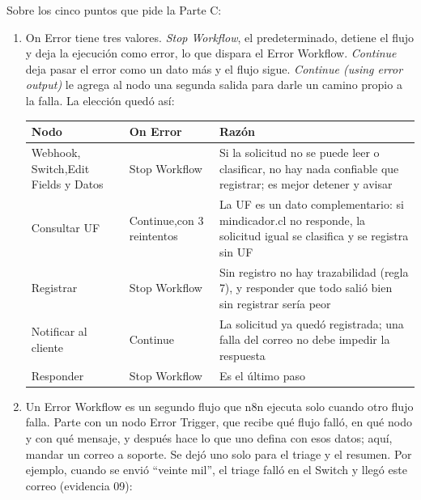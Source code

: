\documentclass{article}
\begin{document}
Sobre los cinco puntos que pide la Parte C:
\begin{enumerate}
\item On Error tiene tres valores. \emph{Stop Workflow}, el predeterminado, detiene el flujo y
deja la ejecución como error, lo que dispara el Error Workflow. \emph{Continue} deja pasar el
error como un dato más y el flujo sigue. \emph{Continue (using error output)} le agrega al nodo
una segunda salida para darle un camino propio a la falla. La elección quedó así:
\medskip
\begin{center}
\footnotesize
\begin{tabular}{p{3.4cm}p{2.6cm}p{7.4cm}}
\toprule
Nodo & On Error & Razón \\
\midrule
Webhook, Switch,\newline Edit Fields y Datos & Stop Workflow & Si la solicitud no se puede leer o clasificar, no hay nada confiable que registrar; es mejor detener y avisar \\
\addlinespace
Consultar UF & Continue,\newline con 3 reintentos & La UF es un dato complementario: si mindicador.cl no responde, la solicitud igual se clasifica y se registra sin UF \\
\addlinespace
Registrar & Stop Workflow & Sin registro no hay trazabilidad (regla 7), y responder que todo salió bien sin registrar sería peor \\
\addlinespace
Notificar al cliente & Continue & La solicitud ya quedó registrada; una falla del correo no debe impedir la respuesta \\
\addlinespace
Responder & Stop Workflow & Es el último paso \\
\bottomrule
\end{tabular}
\end{center}
\medskip
\item Un Error Workflow es un segundo flujo que n8n ejecuta solo cuando otro flujo falla. Parte
con un nodo Error Trigger, que recibe qué flujo falló, en qué nodo y con qué mensaje, y después
hace lo que uno defina con esos datos; aquí, mandar un correo a soporte. Se dejó uno solo para
el triage y el resumen. Por ejemplo, cuando se envió ``veinte mil'', el triage falló en el
Switch y llegó este correo (evidencia 09):
\begin{center}
\end{center}
\end{enumerate}
\end{document}
